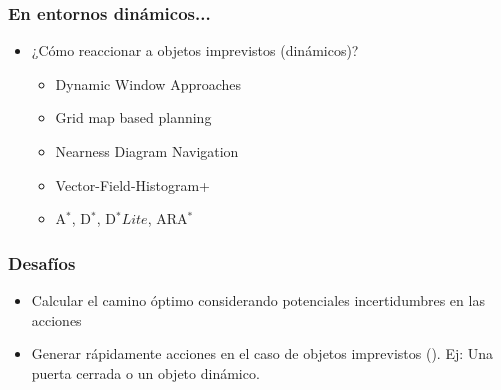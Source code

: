 \begin{frame}
    \frametitle{En entornos dinámicos...}
    
    \begin{itemize}
        \item ¿Cómo reaccionar a objetos imprevistos (dinámicos)?
        
        \begin{itemize}
            \item Dynamic Window Approaches
            \item Grid map based planning
            \item Nearness Diagram Navigation
            \item Vector-Field-Histogram+
            \item A$^{*}$, D$^{*}$, D$^{*} Lite$, ARA$^{*}$
        \end{itemize}
        
    \end{itemize}
    
\end{frame}

\begin{frame}
	\frametitle{Desafíos}
	
	\begin{itemize}
		\item Calcular el camino óptimo considerando potenciales incertidumbres en las acciones
		\item Generar rápidamente acciones en el caso de objetos imprevistos (). Ej: Una puerta cerrada o un objeto dinámico.
	\end{itemize}
	
\end{frame}


